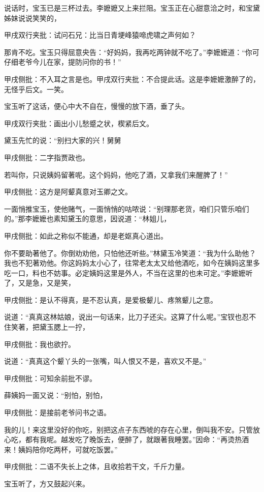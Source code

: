 \begin{parag}
    说话时，宝玉已是三杯过去。李嬷嬷又上来拦阻。宝玉正在心甜意洽之时，和宝黛姊妹说说笑笑的，\begin{note}甲戌双行夹批：试问石兄：比当日青埂峰猿啼虎啸之声何如？\end{note}那肯不吃。宝玉只得屈意央告：“好妈妈，我再吃两钟就不吃了。”李嬷嬷道：“你可仔细老爷今儿在家，提防问你的书！”\begin{note}甲戌侧批：不入耳之言是也。甲戌双行夹批：不合提此话。这是李嬷嬷激醉了的，无怪乎后文。一笑。\end{note}宝玉听了这话，便心中大不自在，慢慢的放下酒，垂了头。\begin{note}甲戌双行夹批：画出小儿愁蹙之状，楔紧后文。\end{note}黛玉先忙的说：“别扫大家的兴！舅舅\begin{note}甲戌侧批：二字指贾政也。\end{note}若叫你，只说姨妈留著呢。这个妈妈，他吃了酒，又拿我们来醒脾了！”\begin{note}甲戌侧批：这方是阿颦真意对玉卿之文。\end{note}一面悄推宝玉，使他赌气，一面悄悄的咕哝说：“别理那老货，咱们只管乐咱们的。”那李嬷嬷也素知黛玉的意思，因说道：“林姐儿，\begin{note}甲戌侧批：如此之称似不能通，却是老妪真心道出。\end{note}你不要助著他了。你倒劝劝他，只怕他还听些。”林黛玉冷笑道：“我为什么助他？我也不犯著劝他。你这妈妈太小心了，往常老太太又给他酒吃，如今在姨妈这里多吃一口，料也不妨事。必定姨妈这里是外人，不当在这里的也未可定。”李嬷嬷听了，又是急，又是笑，\begin{note}甲戌侧批：是认不得真，是不忍认真，是爱极颦儿、疼煞颦儿之意。\end{note}说道：“真真这林姑娘，说出一句话来，比刀子还尖。这算了什么呢。”宝钗也忍不住笑著，把黛玉腮上一拧，\begin{note}甲戌侧批：我也欲拧。\end{note}说道：“真真这个颦丫头的一张嘴，叫人恨又不是，喜欢又不是。”\begin{note}甲戌侧批：可知余前批不谬。\end{note}薛姨妈一面又说：“别怕，别怕，\begin{note}甲戌侧批：是接前老爷问书之语。\end{note}我的儿！来这里没好的你吃，别把这点子东西唬的存在心里，倒叫我不安。只管放心吃，都有我呢。越发吃了晚饭去，便醉了，就跟著我睡罢。”因命：“再烫热酒来！姨妈陪你吃两杯，可就吃饭罢。”\begin{note}甲戌侧批：二语不失长上之体，且收拾若干文，千斤力量。\end{note}宝玉听了，方又鼓起兴来。
\end{parag}


